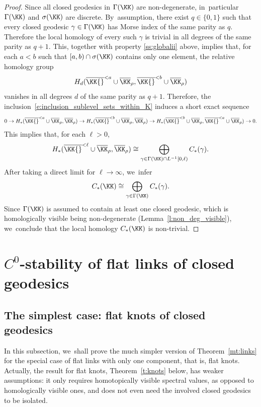 \begin{proof}
Since all closed geodesics in $\Gamma(\KK)$ are non-degenerate, in~particular $\Gamma(\KK)$ and $\sigma(\KK)$ are discrete. By~assumption, there exist $q\in\{0,1\}$ such that every closed geodesic $\gamma\in\Gamma(\KK)$ has Morse index of the same parity as $q$. Therefore the local homology of every such $\gamma$ is trivial in all degrees of the same parity as $q+1$. This, together with property \eqref{ss:globalii} above, implies that, for each $a<b$ such that $[a,b)\cap\sigma(\KK)$ contains only one element, the relative homology group
\[
H_d(\overline\KK{}^{<a}\cup\overline\KK_\rho,\overline\KK{}^{<b}\cup\overline\KK_\rho)
\]
vanishes in all degrees $d$ of the same parity as $q+1$. Therefore, the inclusion~\eqref{e:inclusion_sublevel_sets_within_K} induces a short exact sequence
\begin{align*}
0
\rightarrow
H_*(\overline\KK{}^{<a}\cup\overline\KK_\rho,\overline\KK_\rho)
\to
H_*(\overline\KK{}^{<b}\cup\overline\KK_\rho,\overline\KK_\rho)
\to
H_*(\overline\KK{}^{<b}\cup\overline\KK_\rho,\overline\KK{}^{<a}\cup\overline\KK_\rho)
\rightarrow
0.
\end{align*}
This implies that, for each $\ell>0$,
\begin{align*}
H_*(\overline\KK{}^{<\ell}\cup\overline\KK_\rho,\overline\KK_\rho)
\cong
\bigoplus_{\gamma\in\Gamma(\KK)\cap L^{-1}[0,\ell)}
C_*(\gamma).
\end{align*}
After taking a direct limit for $\ell\to\infty$, we~infer
\begin{align*}
C_*(\KK)
\cong
\bigoplus_{\gamma\in\Gamma(\KK)}
C_*(\gamma).
\end{align*}
Since $\Gamma(\KK)$ is assumed to contain at least one closed geodesic, which is homologically visible being non-degenerate (Lemma~\ref{l:non_deg_visible}), we~conclude that the local homology $C_*(\KK)$ is non-trivial.
\end{proof}

\section{\texorpdfstring{$C^0$}{C0}-stability of flat links of closed geodesics}\label{s:flat_links}

\subsection{The simplest case: flat knots of closed geodesics}

In this subsection, we~shall prove the much simpler version of Theorem~\ref{mt:links} for the special case of flat links with only one component, that is, flat knots. Actually, the result for flat knots, Theorem~\ref{t:knots} below, has weaker assumptions: it only requires homotopically visible spectral values, as opposed to homologically visible ones, and does not even need the involved closed geodesics to be isolated.

